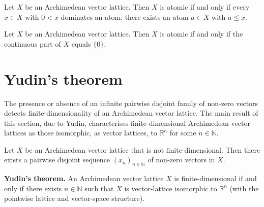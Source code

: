 \begin{theorem}
\label{thm:isAtomicVectorLattice-iff-forall-pos-dominates-atom}
\leanok
{}
Let $X$ be an Archimedean vector lattice. Then $X$ is atomic if and
only if every $x \in X$ with $0 < x$ dominates an atom: there
exists an atom $a \in X$ with $a \le x$.
\end{theorem}

\begin{theorem}
\label{thm:isAtomicVectorLattice-iff-continuousPart-trivial}
\leanok
{}
Let $X$ be an Archimedean vector lattice. Then $X$ is atomic if and
only if the continuous part of $X$ equals $\{0\}$.
\end{theorem}

\section{Yudin's theorem}

The presence or absence of an infinite pairwise disjoint family of
non-zero vectors detects finite-dimensionality of an Archimedean
vector lattice. The main result of this section, due to Yudin,
characterises finite-dimensional Archimedean vector lattices as
those isomorphic, as vector lattices, to $\mathbb{R}^n$ for some
$n \in \mathbb{N}$.

\begin{theorem}
\label{thm:exists-disjoint-seq-of-not-finiteDimensional}
\leanok
{}
Let $X$ be an Archimedean vector lattice that is not
finite-dimensional. Then there exists a pairwise disjoint sequence
$(x_n)_{n \in \mathbb{N}}$ of non-zero vectors in $X$.
\end{theorem}

\begin{theorem}
\label{thm:finiteDimensional-iff-latticeIso-pi}
\leanok
{}
\textbf{Yudin's theorem.} An Archimedean vector lattice $X$ is
finite-dimensional if and only if there exists $n \in \mathbb{N}$
such that $X$ is vector-lattice isomorphic to $\mathbb{R}^n$ (with
the pointwise lattice and vector-space structure).
\end{theorem}


